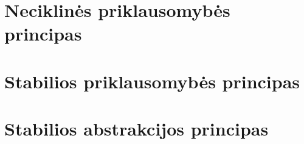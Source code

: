 \label{section:package:crp}


\section{Neciklinės priklausomybės principas}

\label{section:package:adp}


\section{Stabilios priklausomybės principas}

\label{section:package:sdp}


\section{Stabilios abstrakcijos principas}

\label{section:package:sap}

